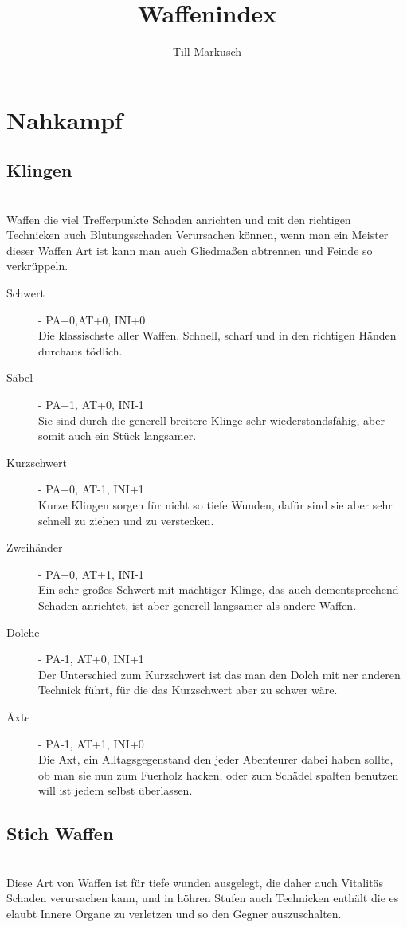 \documentclass[a4paper,12pt,oneside]{book}
\title{Waffenindex}
\author{Till Markusch}
\date{}
\begin{document}
\maketitle
\tableofcontents

\chapter{Nahkampf}

\section{Klingen}
\\ Waffen die viel Trefferpunkte Schaden anrichten und mit den richtigen Technicken auch Blutungsschaden Verursachen können,
   wenn man ein Meister dieser Waffen Art ist kann man auch Gliedmaßen abtrennen und Feinde so verkrüppeln.

\begin{description}
\item[Schwert]- PA+0,AT+0, INI+0
\\Die klassischste aller Waffen. Schnell, scharf und in den richtigen Händen durchaus tödlich.
\item[Säbel]- PA+1, AT+0, INI-1
\\Sie sind durch die generell breitere Klinge sehr wiederstandsfähig, aber somit auch ein Stück langsamer.
\item[Kurzschwert] - PA+0, AT-1, INI+1
\\Kurze Klingen sorgen für nicht so tiefe Wunden, dafür sind sie aber sehr schnell zu ziehen und zu verstecken.
\item[Zweihänder] - PA+0, AT+1, INI-1
\\Ein sehr großes Schwert mit mächtiger Klinge, das auch dementsprechend Schaden anrichtet, ist aber generell langsamer als andere Waffen.
\item[Dolche] - PA-1, AT+0, INI+1
\\Der Unterschied zum Kurzschwert ist das man den Dolch mit ner anderen Technick führt, für die das Kurzschwert aber zu schwer wäre.
\item[Äxte] - PA-1, AT+1, INI+0
\\Die Axt, ein Alltagsgegenstand den jeder Abenteurer dabei haben sollte, ob man sie nun zum Fuerholz hacken, oder zum Schädel spalten benutzen will ist jedem selbst überlassen.
\end{description}

\section{Stich Waffen}
\\Diese Art von Waffen ist für tiefe wunden ausgelegt, die daher auch Vitalitäs Schaden verursachen kann, und in höhren Stufen auch Technicken 
   enthält die es elaubt Innere Organe zu verletzen und so den Gegner auszuschalten.
\end{document}
